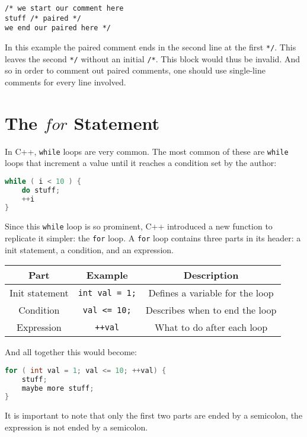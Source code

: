 \documentclass[12pt, a4paper]{report}
\begin{document}
\begin{flushleft}
  \noindent \verb|/* we start our comment here| \\
  \verb|stuff /* paired */| \\
  \verb|we end our paired here */| \\
\end{flushleft}

\noindent In this example the paired comment ends in the second line at the first \verb|*/|. This leaves the second \verb|*/| without an initial \verb|/*|.
This block would thus be invalid. And so in order to comment out paired comments, one should use single-line comments for every line involved.
\section{The $for$ Statement}
In C++, \verb|while| loops are very common. The most common of these are \verb|while| loops that increment a value until it reaches a condition set by the author:

\begin{lstlisting}[language=C++]
while ( i < 10 ) {
    do stuff;
    ++i
}
\end{lstlisting}

\noindent Since this \verb|while| loop is so prominent, C++ introduced a new function to replicate it simpler: the \verb|for| loop.
A \verb|for| loop contains three parts in its header: a init statement, a condition, and an expression.

\begin{center}
  \begin{tabular}{ |c|c|c| }
    \hline
    \textbf{Part} & \textbf{Example} & \textbf{Description} \\
    \hline
    Init statement & \verb|int val = 1;| & Defines a variable for the loop \\
    \hline
    Condition & \verb|val <= 10;| & Describes when to end the loop \\
    \hline
    Expression & \verb|++val| & What to do after each loop \\
    \hline
  \end{tabular}
\end{center}
And all together this would become:
\begin{lstlisting}[language=C++]
for ( int val = 1; val <= 10; ++val) {
    stuff;
    maybe more stuff;
}
\end{lstlisting}
It is important to note that only the first two parts are ended by a semicolon, the expression is not ended by a semicolon. 
\end{document}
